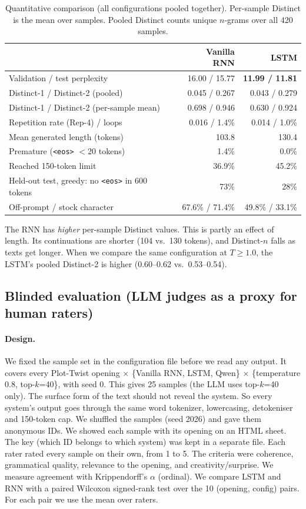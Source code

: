 \documentclass[11pt,a4paper]{article}
\begin{document}
\begin{table}[H]\centering\small
\caption{Quantitative comparison (all configurations pooled together). Per-sample Distinct is the
mean over samples. Pooled Distinct counts unique $n$-grams over all 420 samples.}\label{tab:quant}
\begin{tabular}{lrr}
\toprule
 & Vanilla RNN & LSTM \\
\midrule
Validation / test perplexity & 16.00 / 15.77 & \textbf{11.99 / 11.81} \\
Distinct-1 / Distinct-2 (pooled) & 0.045 / 0.267 & 0.043 / 0.279 \\
Distinct-1 / Distinct-2 (per-sample mean) & 0.698 / 0.946 & 0.630 / 0.924 \\
Repetition rate (Rep-4) / loops & 0.016 / 1.4\% & 0.014 / 1.0\% \\
Mean generated length (tokens) & 103.8 & 130.4 \\
Premature (\texttt{<eos>} $<$20 tokens) & 1.4\% & 0.0\% \\
Reached 150-token limit & 36.9\% & 45.2\% \\
Held-out test, greedy: no \texttt{<eos>} in 600 tokens & 73\% & 28\% \\
Off-prompt / stock character & 67.6\% / 71.4\% & 49.8\% / 33.1\% \\
\bottomrule
\end{tabular}
\end{table}

The RNN has \emph{higher} per-sample Distinct values. This is partly an effect of length. Its
continuations are shorter (104 vs.\ 130 tokens), and Distinct-$n$ falls as texts get longer. When
we compare the same configuration at $T\geq1.0$, the LSTM's pooled Distinct-2 is higher
(0.60--0.62 vs.\ 0.53--0.54).

\subsection{Blinded evaluation (LLM judges as a proxy for human raters)}
\paragraph{Design.} We fixed the sample set in the configuration file before we read any output.
It covers every Plot-Twist opening $\times$ \{Vanilla RNN, LSTM, Qwen\} $\times$ \{temperature 0.8,
top-$k$=40\}, with seed 0. This gives 25 samples (the LLM uses top-$k$=40 only). The surface form
of the text should not reveal the system. So every system's output goes through the same word
tokenizer, lowercasing, detokeniser and 150-token cap. We shuffled the samples (seed 2026) and gave
them anonymous IDs. We showed each sample with its opening on an HTML sheet. The key (which ID
belongs to which system) was kept in a separate file. Each rater rated every sample on their own,
from 1 to 5. The criteria were coherence, grammatical quality, relevance to the opening, and
creativity/surprise. We measure agreement with Krippendorff's $\alpha$ (ordinal). We compare LSTM
and RNN with a paired Wilcoxon signed-rank test over the 10 (opening, config) pairs. For each pair
we use the mean over raters.
\end{document}
